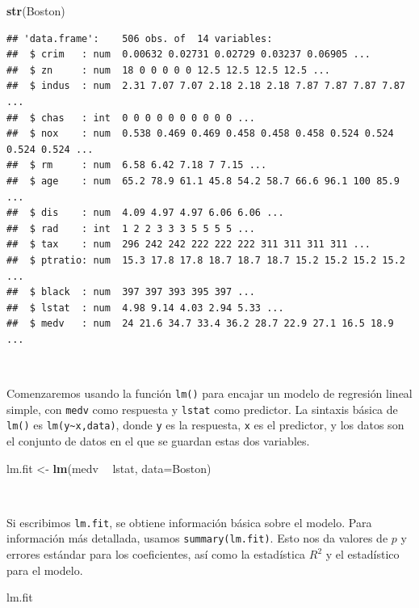 \documentclass[]{book}
\newenvironment{Shaded}{\begin{snugshade}}{\end{snugshade}}
\newcommand{\KeywordTok}[1]{\textcolor[rgb]{0.13,0.29,0.53}{\textbf{#1}}}
\newcommand{\DataTypeTok}[1]{\textcolor[rgb]{0.13,0.29,0.53}{#1}}
\newcommand{\StringTok}[1]{\textcolor[rgb]{0.31,0.60,0.02}{#1}}
\newcommand{\OperatorTok}[1]{\textcolor[rgb]{0.81,0.36,0.00}{\textbf{#1}}}
\newcommand{\NormalTok}[1]{#1}
\begin{document}
\begin{Shaded}
\begin{Highlighting}[]
\KeywordTok{str}\NormalTok{(Boston)}
\end{Highlighting}
\end{Shaded}

\begin{verbatim}
## 'data.frame':    506 obs. of  14 variables:
##  $ crim   : num  0.00632 0.02731 0.02729 0.03237 0.06905 ...
##  $ zn     : num  18 0 0 0 0 0 12.5 12.5 12.5 12.5 ...
##  $ indus  : num  2.31 7.07 7.07 2.18 2.18 2.18 7.87 7.87 7.87 7.87 ...
##  $ chas   : int  0 0 0 0 0 0 0 0 0 0 ...
##  $ nox    : num  0.538 0.469 0.469 0.458 0.458 0.458 0.524 0.524 0.524 0.524 ...
##  $ rm     : num  6.58 6.42 7.18 7 7.15 ...
##  $ age    : num  65.2 78.9 61.1 45.8 54.2 58.7 66.6 96.1 100 85.9 ...
##  $ dis    : num  4.09 4.97 4.97 6.06 6.06 ...
##  $ rad    : int  1 2 2 3 3 3 5 5 5 5 ...
##  $ tax    : num  296 242 242 222 222 222 311 311 311 311 ...
##  $ ptratio: num  15.3 17.8 17.8 18.7 18.7 18.7 15.2 15.2 15.2 15.2 ...
##  $ black  : num  397 397 393 395 397 ...
##  $ lstat  : num  4.98 9.14 4.03 2.94 5.33 ...
##  $ medv   : num  24 21.6 34.7 33.4 36.2 28.7 22.9 27.1 16.5 18.9 ...
\end{verbatim}

~

Comenzaremos usando la función \texttt{lm()} para encajar un modelo de
regresión lineal simple, con \texttt{medv} como respuesta y
\texttt{lstat} como predictor. La sintaxis básica de \texttt{lm()} es
\texttt{lm(y\textasciitilde{}x,data)}, donde \texttt{y} es la respuesta,
\texttt{x} es el predictor, y los datos son el conjunto de datos en el
que se guardan estas dos variables.

\begin{Shaded}
\begin{Highlighting}[]
\NormalTok{lm.fit <-}\StringTok{ }\KeywordTok{lm}\NormalTok{(medv }\OperatorTok{~}\StringTok{ }\NormalTok{lstat, }\DataTypeTok{data=}\NormalTok{Boston)}
\end{Highlighting}
\end{Shaded}

~

Si escribimos \texttt{lm.fit}, se obtiene información básica sobre el
modelo. Para información más detallada, usamos \texttt{summary(lm.fit)}.
Esto nos da valores de \(p\) y errores estándar para los coeficientes,
así como la estadística \(R^2\) y el estadístico para el modelo.

\begin{Shaded}
\begin{Highlighting}[]
\NormalTok{lm.fit}
\end{Highlighting}
\end{Shaded}
\end{document}
